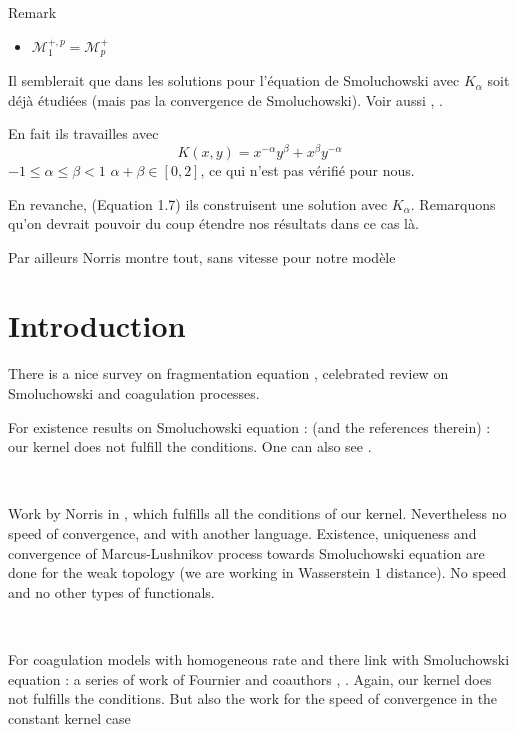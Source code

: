 \documentclass[a4paper,11pt, reqno]{amsart}
\newcommand{\cM}{\mathcal{M}}	\newcommand{\MM}{\mathbbm{M}}
\newcommand{\red}[1]{{\color{red} #1}}
\newcommand{\1}{\mathbbm{1}}
\theoremstyle{plain}
\theoremstyle{definition}
\begin{document}
\red{Remark
\begin{itemize}
  \item $\cM^{+, p}_1 =\cM^+_p$
\end{itemize}}

\red{Il semblerait que dans
{\cite{escobedoDustSelfsimilaritySmoluchowski2006}} les solutions pour
l'{\'e}quation de Smoluchowski avec $K_{\alpha}$ soit d{\'e}j{\`a}
{\'e}tudi{\'e}es (mais pas la convergence de Smoluchowski). Voir aussi
{\cite{escobedoGelationCoagulationFragmentation2002}},
{\cite{barikMassconservingSolutionsSmoluchowski2020}}.

En fait ils travailles avec
\[ K (x, y) = x^{- \alpha} y^{\beta} + x^{\beta} y^{- \alpha} \]
$- 1 \le \alpha \le \beta < 1$ $\alpha + \beta \in [0, 2]$, ce qui
n'est pas v{\'e}rifi{\'e} pour nous.

En revanche, {\cite{fournierExistenceSelfSimilarSolutions2005}} (Equation 1.7)
ils construisent une solution avec $K_{\alpha}$. Remarquons qu'on devrait
pouvoir du coup {\'e}tendre nos r{\'e}sultats dans ce cas l{\`a}.

Par ailleurs Norris montre tout, sans vitesse pour notre modèle}

\section{Introduction}

There is a nice survey on fragmentation equation
{\cite{deaconuProbabilisticRepresentationsFragmentation2023}}, celebrated
review {\cite{aldousDeterministicStochasticModels1999}} on Smoluchowski and
coagulation processes.

For existence results on Smoluchowski equation :
{\cite{laurencotClassContinuousCoagulationFragmentation2000}}
{\cite{lambExistenceUniquenessResults2004}} (and the references therein) : our
kernel does not fulfill the conditions. One can also see
{\cite{niethammerSelfsimilarSolutionsFat2013}}.

\

Work by Norris in {\cite{norrisSmoluchowskisCoagulationEquation1999}}, which
fulfills all the conditions of our kernel. Nevertheless no speed of
convergence, and with another language. Existence, uniqueness and convergence
of Marcus-Lushnikov process towards Smoluchowski equation are done for the
weak topology (we are working in Wasserstein $1$ distance). No speed and no
other types of functionals.

\

For coagulation models with homogeneous rate and there link with
Smoluchowski equation : a series of work of Fournier and coauthors
{\cite{fournierStochasticCoalescenceHomogeneouslike2009}},
{\cite{fournierConvergenceMarcusLushnikov2004}}
{\cite{fournierStochasticCoalescents2006}}
{\cite{fournierDistanceCoagulation2006}}
{\cite{cepedaSmoluchowskisEquationRate2011a}}. Again, our kernel does not
fulfills the conditions. But also the work
{\cite{kyprianouUniversalityClassFragmentationcoalescence2018}} for the speed
of convergence in the constant kernel case
\end{document}
